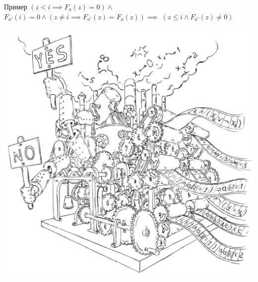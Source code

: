 \documentclass{beamer}
\begin{document}
\begin{frame}{Пример}
$(z < i \implies F_a(z) = 0) \wedge$\newline
$F_{a'}(i) = 0 \wedge (z \ne i \implies F_{a'}(z) = F_a(z))\implies$\newline
$(z \le i \wedge F_{a'}(z) \ne 0)$
\end{frame}

\begin{frame}
\includegraphics[scale=0.5]{../decision-procedure.png}
\end{frame}
\end{document}
